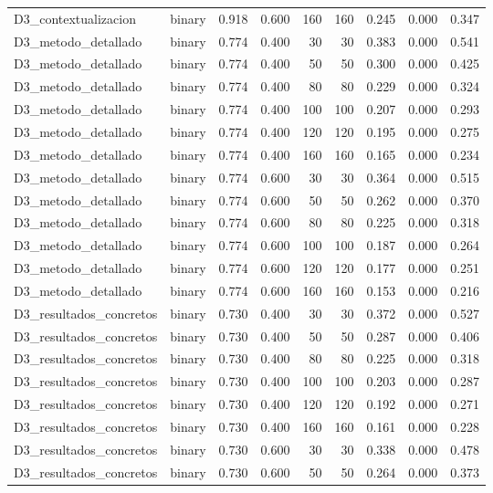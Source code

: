 \begin{table}
{\begin{tabular}{llrrrrrrr}
D3\_contextualizacion & binary & 0.918 & 0.600 & 160 & 160 & 0.245 & 0.000 & 0.347 \\
D3\_metodo\_detallado & binary & 0.774 & 0.400 & 30 & 30 & 0.383 & 0.000 & 0.541 \\
D3\_metodo\_detallado & binary & 0.774 & 0.400 & 50 & 50 & 0.300 & 0.000 & 0.425 \\
D3\_metodo\_detallado & binary & 0.774 & 0.400 & 80 & 80 & 0.229 & 0.000 & 0.324 \\
D3\_metodo\_detallado & binary & 0.774 & 0.400 & 100 & 100 & 0.207 & 0.000 & 0.293 \\
D3\_metodo\_detallado & binary & 0.774 & 0.400 & 120 & 120 & 0.195 & 0.000 & 0.275 \\
D3\_metodo\_detallado & binary & 0.774 & 0.400 & 160 & 160 & 0.165 & 0.000 & 0.234 \\
D3\_metodo\_detallado & binary & 0.774 & 0.600 & 30 & 30 & 0.364 & 0.000 & 0.515 \\
D3\_metodo\_detallado & binary & 0.774 & 0.600 & 50 & 50 & 0.262 & 0.000 & 0.370 \\
D3\_metodo\_detallado & binary & 0.774 & 0.600 & 80 & 80 & 0.225 & 0.000 & 0.318 \\
D3\_metodo\_detallado & binary & 0.774 & 0.600 & 100 & 100 & 0.187 & 0.000 & 0.264 \\
D3\_metodo\_detallado & binary & 0.774 & 0.600 & 120 & 120 & 0.177 & 0.000 & 0.251 \\
D3\_metodo\_detallado & binary & 0.774 & 0.600 & 160 & 160 & 0.153 & 0.000 & 0.216 \\
D3\_resultados\_concretos & binary & 0.730 & 0.400 & 30 & 30 & 0.372 & 0.000 & 0.527 \\
D3\_resultados\_concretos & binary & 0.730 & 0.400 & 50 & 50 & 0.287 & 0.000 & 0.406 \\
D3\_resultados\_concretos & binary & 0.730 & 0.400 & 80 & 80 & 0.225 & 0.000 & 0.318 \\
D3\_resultados\_concretos & binary & 0.730 & 0.400 & 100 & 100 & 0.203 & 0.000 & 0.287 \\
D3\_resultados\_concretos & binary & 0.730 & 0.400 & 120 & 120 & 0.192 & 0.000 & 0.271 \\
D3\_resultados\_concretos & binary & 0.730 & 0.400 & 160 & 160 & 0.161 & 0.000 & 0.228 \\
D3\_resultados\_concretos & binary & 0.730 & 0.600 & 30 & 30 & 0.338 & 0.000 & 0.478 \\
D3\_resultados\_concretos & binary & 0.730 & 0.600 & 50 & 50 & 0.264 & 0.000 & 0.373 \\

\end{tabular}}
\end{table}
